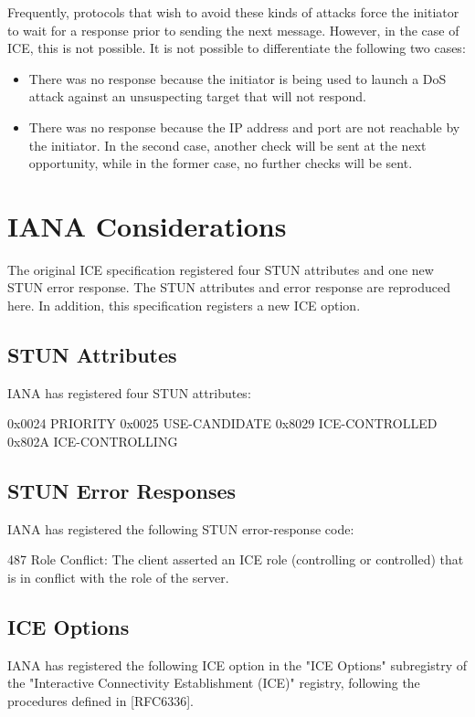 \documentclass{article}
\begin{document}
Frequently, protocols that wish to avoid these kinds of attacks force the initiator to wait for a response prior to sending the next message.  However, in the case of ICE, this is not possible.  It is not possible to differentiate the following two cases:

\begin{itemize}
\item There was no response because the initiator is being used to launch a DoS attack against an unsuspecting target that will not respond.
\item There was no response because the IP address and port are not reachable by the initiator.
In the second case, another check will be sent at the next opportunity, while in the former case, no further checks will be sent.

\end{itemize}
\section{IANA Considerations}

The original ICE specification registered four STUN attributes and one new STUN error response.  The STUN attributes and error response are reproduced here.  In addition, this specification registers a new ICE option.

\subsection{STUN Attributes}

IANA has registered four STUN attributes:

0x0024 PRIORITY 0x0025 USE-CANDIDATE 0x8029 ICE-CONTROLLED 0x802A ICE-CONTROLLING

\subsection{STUN Error Responses}

IANA has registered the following STUN error-response code:

487   Role Conflict: The client asserted an ICE role (controlling or controlled) that is in conflict with the role of the server.

\subsection{ICE Options}

IANA has registered the following ICE option in the "ICE Options" subregistry of the "Interactive Connectivity Establishment (ICE)" registry, following the procedures defined in [RFC6336].
\end{document}
